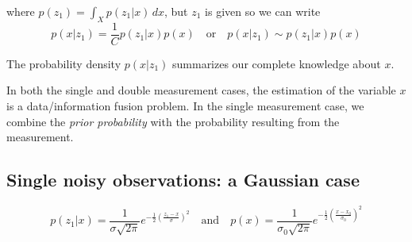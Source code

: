 where $p(z_1) = \int_X p(z_1|x) \,dx$, but $z_1$ is given so we can write
\begin{equation*}
  p(x|z_1) = \frac{1}{C} p(z_1|x) p(x) \quad \text{or} \quad
    p(x|z_1) \sim p(z_1|x) p(x)
\end{equation*}

The probability density $p(x|z_1)$ summarizes our complete knowledge about $x$.
\begin{remark}
  In both the single and double measurement cases, the estimation of the
  variable $x$ is a data/information fusion problem. In the single measurement
  case, we combine the \textit{prior probability} with the probability resulting
  from the measurement.
\end{remark}

\subsection{Single noisy observations: a Gaussian case}
\begin{equation*}
  p(z_1|x) = \frac{1}{\sigma \sqrt{2\pi}} e^{-\frac{1}{2}
    \left(\frac{z_1 - x}{\sigma}\right)^2}
  \quad \text{and} \quad
  p(x) = \frac{1}{\sigma_0 \sqrt{2\pi}} e^{-\frac{1}{2}
    \left(\frac{x - x_0}{\sigma_0}\right)^2}
\end{equation*}

